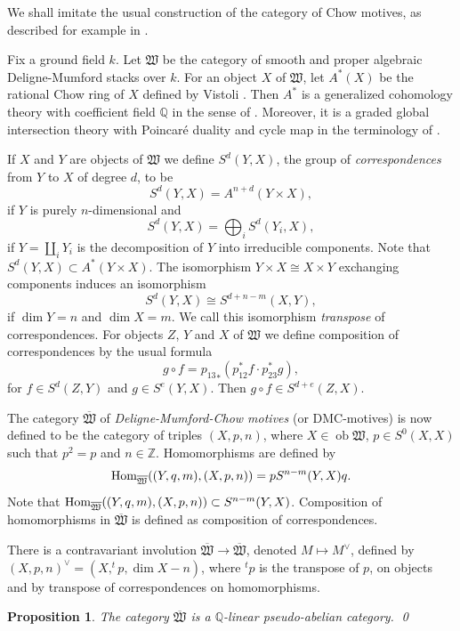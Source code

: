 \documentclass[11pt]{amsart}
\newtheorem{prop}{Proposition}[section]
\theoremstyle{definition}
\theoremstyle{remark}
\newcommand{\upst}{^{\ast}}
\newcommand{\lst}{_{\ast}}
\newcommand{\WW}{{\mathfrak{W}}}
\newcommand{\zz}{{\mathbb{Z}}}
\newcommand{\qq}{{\mathbb{Q}}}
\newcommand{\ob}{\operatorname{ob}}
\newcommand{\Hom}{\operatorname{\rm Hom}\nolimits}
\newcommand{\comp}{\mathbin{{\scriptstyle\circ}}}
\newcommand{\ol}{\overline}
\theoremstyle{plain}
\theoremstyle{definition}
\theoremstyle{remark}
\begin{document}
We shall imitate the usual construction of the category of Chow motives, as
described for example in \cite{scholl}.

Fix a ground field \(k\). Let \(\WW\) be the category of smooth and proper
algebraic Deligne-Mumford stacks over \(k\). For an
object \(X\) of \(\WW\), let \(A\upst(X)\) be the rational Chow ring of \(X\) defined
by Vistoli \cite{vistoli}. Then \(A\upst\)
is a generalized cohomology theory with coefficient field \(\qq\) in the sense of
\cite{kleiman}. Moreover, it is a graded
global intersection theory with Poincar\'e duality and cycle map in the
terminology of \cite{kleiman}.

If \(X\) and \(Y\) are objects of \(\WW\) we define \(S^d(Y,X)\), the group of {\em
correspondences }from \(Y\) to \(X\) of degree
\(d\), to be
\[
S^d(Y,X)=A^{n+d}(Y\times X),
\]
if \(Y\) is purely \(n\)-dimensional and
\[
S^d(Y,X)=\bigoplus_i S^d(Y_i,X),
\]
if \(Y=\coprod_i Y_i\) is the decomposition of \(Y\) into irreducible components.
Note that \(S^d(Y,X)\subset A\upst(Y\times
X)\). The isomorphism \(Y\times X\cong X\times Y\) exchanging components induces
an isomorphism
\[
S^d(Y,X)\cong S^{d+n-m}(X,Y),
\]
if \(\dim Y=n\) and \(\dim X=m\). We call this isomorphism {\em transpose }of
correspondences.
For objects \(Z\), \(Y\) and \(X\) of \(\WW\) we define composition of correspondences
by the usual formula
\[
g\comp f={p_{13}}\lst(p_{12}\upst f\cdot p_{23}\upst g),
\]
for \(f\in S^d(Z,Y)\) and \(g\in S^e(Y,X)\). Then \(g\comp f\in S^{d+e}(Z,X)\).

The category \(\ol{\WW}\) of {\em Deligne-Mumford-Chow motives } (or DMC-motives)
is now defined to be the category of
triples \((X,p,n)\), where \(X\in \ob\WW\), \(p\in S^0(X,X)\) such that \(p^2=p\) and
\(n\in\zz\). Homomorphisms are defined by
\[
\Hom_{\ol{\WW}}((Y,q,m),(X,p,n))=p S^{n-m}(Y,X) q.
\]
Note that \(\Hom_{\ol{\WW}}((Y,q,m),(X,p,n))\subset S^{n-m}(Y,X)\). Composition
of homomorphisms in \(\ol{\WW}\) is defined
as composition of correspondences.

There is a contravariant involution \(\ol{\WW}\rightarrow\ol{\WW}\), denoted
\(M\mapsto M^{\vee}\), defined by
\((X,p,n)^{\vee}=(X,^tp,\dim X-n)\), where \(^tp\) is the transpose of \(p\), on
objects and by transpose of correspondences on
homomorphisms.

\begin{prop}
The category \(\ol{\WW}\) is a \(\qq\)-linear pseudo-abelian category. \qed
\end{prop}
\end{document}
